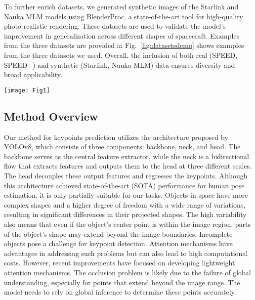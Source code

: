 \documentclass[a4paper,fleqn]{cas-sc}
\begin{document}
To further enrich datasets, we generated synthetic images of the Starlink and Nauka MLM models using BlenderProc, a state-of-the-art tool for high-quality photo-realistic rendering. These datasets are used to validate the model's improvement in generalization across different shapes of spacecraft. Examples from the three datasets are provided in Fig.~\ref{fig:datasetsdemo} shows examples from the three datasets we used. Overall, the inclusion of both real (SPEED, SPEED+) and synthetic (Starlink, Nauka MLM) data ensures diversity and broad applicability.

\begin{figure*}[!htbp]
	\centering
	\texttt{[image: Fig1]} 
	\caption{Three kinds of spacecrafts demo of the three datasets we used, SPEED+ is an open dataset proposed by ESA, and Nauka MLM and Starlink are self-made synthetic datasets.}
	\label{fig:datasetsdemo}
\end{figure*}

\subsection{Method Overview}\label{sec:Method_Overview}
Our method for keypoints prediction utilizes the architecture proposed by YOLOv8, which consists of three components: backbone, neck, and head. The backbone serves as the central feature extractor, while the neck is a bidirectional flow that extracts features and outputs them to the head at three different scales. The head decouples these output features and regresses the keypoints. Although this architecture achieved state-of-the-art (SOTA) performance for human pose estimation, it is only partially suitable for our tasks. Objects in space have more complex shapes and a higher degree of freedom with a wide range of variations, resulting in significant differences in their projected shapes. The high variability also means that even if the object's center point is within the image region, parts of the object's shape may extend beyond the image boundaries. Incomplete objects pose a challenge for keypoint detection. Attention mechanisms have advantages in addressing such problems but can also lead to high computational costs. However, recent improvements have focused on developing lightweight attention mechanisms. The occlusion problem is likely due to the failure of global understanding, especially for points that extend beyond the image range. The model needs to rely on global inference to determine these points accurately.
\end{document}
